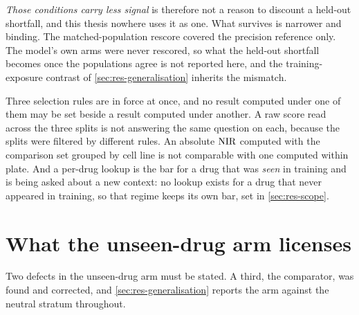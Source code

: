 

\emph{Those conditions carry less signal} is therefore not a reason to discount
a held-out shortfall, and this thesis nowhere uses it as one. What survives is
narrower and binding. The matched-population rescore covered the precision
reference only. The model's own arms were never rescored, so what the held-out
shortfall becomes once the populations agree is not reported here, and the
training-exposure contrast of \cref{sec:res-generalisation} inherits the
mismatch.

%
\begin{scopelimit}
Three selection rules are in force at once, and no result computed under one of
them may be set beside a result computed under another. A raw score read across
the three splits is not answering the same question on each, because the splits
were filtered by different rules. An absolute $\textrm{NIR}$ computed with the
comparison set grouped by cell line is not comparable with one computed within
plate. And a per-drug lookup is the bar for a drug that was \emph{seen} in
training and is being asked about a new context: no lookup exists for a drug
that never appeared in training, so that regime keeps its own bar, set in
\cref{sec:res-scope}.
\end{scopelimit}

\section{What the unseen-drug arm licenses}

Two defects in the unseen-drug arm must be stated. A third, the comparator, was
found and corrected, and \cref{sec:res-generalisation} reports the arm against
the neutral stratum throughout.

